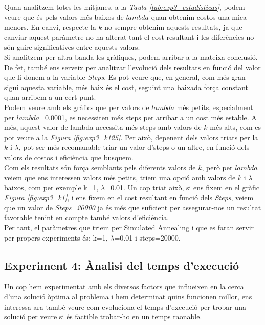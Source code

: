 \documentclass[a4paper]{article}
\begin{document}
	Quan analitzem totes les mitjanes, a la \textit{Taula \ref{tab:exp3_estadisticas}}, podem veure que és pels valors més baixos de $lambda$ quan obtenim costos una mica menors. En canvi, respecte la $k$ no sempre obtenim aquests resultats, ja que canviar aquest paràmetre no ha alterat tant el cost resultant i les diferències no són gaire significatives entre aquests valors. \\

	Si analitzem per altra banda les gràfiques, podem arribar a la mateixa conclusió. De fet, també ens serveix per analitzar l'evolució dels resultats en funció del valor que li donem a la variable \textit{Steps}. Es pot veure que, en general, com més gran sigui aquesta variable, més baix és el cost, seguint una baixada força constant quan arribem a un cert punt. \\
	
	Podem veure amb els gràfics que per valors de $lambda$ més petits, especialment per $lambda$=0.0001, es necessiten més steps per arribar a un cost més estable. A més, aquest valor de lambda necessita més steps amb valors de $k$ més alts, com es pot veure a la \textit{Figura \ref{fig:exp3_k125}}. Per això, depenent dels valors triats per la $k$ i $\lambda$, pot ser més recomanable triar un valor d'steps o un altre, en funció dels valors de costos i eficiència que busquem. \\

	Com els resultats són força semblants pels diferents valors de $k$, però per $lambda$ veiem que ens interessen valors més petits, triem una opció amb valors de $k$ i $\lambda$ baixos, com per exemple k=1, $\lambda$=0.01. Un cop triat això, si ens fixem en el gràfic \textit{Figura \ref{fig:exp3_k1}}, i ens fixem en el cost resultant en funció dels \textit{Steps}, veiem que un valor de \textit{Steps=20000} ja és més que suficient per assegurar-nos un resultat favorable tenint en compte també valors d'eficiència. \\
		
	Per tant, el paràmetres que triem per Simulated Annealing i que es faran servir per propers experiments és: k=1, $\lambda$=0.01 i steps=20000. \\
	

	\subsection{Experiment 4: Ànalisi del temps d'execució}

	Un cop hem experimentat amb els diversos factors que influeixen en la cerca d'una solució òptima al problema i hem determinat quins funcionen millor, ens interessa ara també veure com evoluciona el temps d'execució per trobar una solució per veure si és factible trobar-ho en un temps raonable.\\
\end{document}
